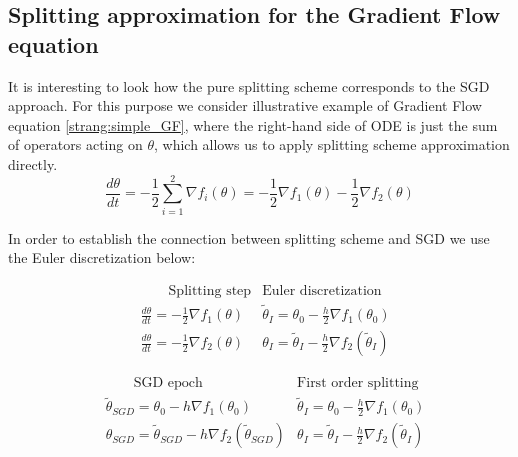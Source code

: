 \documentclass{article}
\begin{document}
\subsection{Splitting approximation for the Gradient Flow equation}

It is interesting to look how the pure splitting scheme corresponds to the SGD approach. For this purpose we consider illustrative example of Gradient Flow equation \ref{strang:simple_GF}, where the right-hand side of ODE is just the sum of operators acting on $\theta$, which allows us to apply splitting scheme approximation directly.
\begin{equation}
\label{strang:simple_GF}
\frac{d \theta}{d t} = -\frac{1}{2} \sum\limits_{i=1}^2 \nabla f_i (\theta) = - \frac{1}{2} \nabla f_1 (\theta) -\frac{1}{2}  \nabla f_2 (\theta)
\end{equation}

In order to establish the connection between splitting scheme and SGD we use the Euler discretization below:


\begin{align*}
&\qquad\text{Splitting step} &\text{Euler discretization} \\
&\frac{d \theta}{d t} = -\frac{1}{2}\nabla f_1(\theta) &\tilde{\theta}_{I} = \theta_0 - \frac{h}{2}\nabla f_1 (\theta_0) \\
&\frac{d \theta}{d t} = -\frac{1}{2}\nabla f_2(\theta) &\theta_{I} = \tilde{\theta}_{I} - \frac{h}{2}\nabla f_2 (\tilde{\theta}_{I})
\end{align*}


\begin{align*}
&\qquad\text{SGD epoch} &\text{First order splitting} \\
&\tilde{\theta}_{SGD} = \theta_0 - h \nabla f_1 (\theta_0) &\tilde{\theta}_{I} = \theta_0 - \frac{h}{2}\nabla f_1 (\theta_0) \\
&\theta_{SGD} = \tilde{\theta}_{SGD} - h \nabla f_2 (\tilde{\theta}_{SGD}) &\theta_{I} = \tilde{\theta}_{I} - \frac{h}{2}\nabla f_2 (\tilde{\theta}_{I})
\end{align*}
\end{document}
